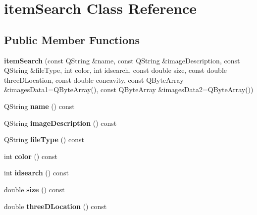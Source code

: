 \hypertarget{classitemSearch}{}\section{item\+Search Class Reference}
\label{classitemSearch}
\subsection*{Public Member Functions}
\begin{DoxyCompactItemize}
\item 
{\bfseries item\+Search} (const Q\+String \&name, const Q\+String \&image\+Description, const Q\+String \&file\+Type, int color, int idsearch, const double size, const double three\+D\+Location, const double concavity, const Q\+Byte\+Array \&images\+Data1=Q\+Byte\+Array(), const Q\+Byte\+Array \&images\+Data2=Q\+Byte\+Array())\hypertarget{classitemSearch_a85c67b414c3c87a1bd7b996bc02aef5d}{}\label{classitemSearch_a85c67b414c3c87a1bd7b996bc02aef5d}

\item 
Q\+String {\bfseries name} () const \hypertarget{classitemSearch_a249682fe8a4947710ad71a1953a7091d}{}\label{classitemSearch_a249682fe8a4947710ad71a1953a7091d}

\item 
Q\+String {\bfseries image\+Description} () const \hypertarget{classitemSearch_adfd20da4a00f458f588fe10efd343fce}{}\label{classitemSearch_adfd20da4a00f458f588fe10efd343fce}

\item 
Q\+String {\bfseries file\+Type} () const \hypertarget{classitemSearch_a39f067ed6a2b31483f757b1ee6ad8c76}{}\label{classitemSearch_a39f067ed6a2b31483f757b1ee6ad8c76}

\item 
int {\bfseries color} () const \hypertarget{classitemSearch_acfb32785b9acaab5c16c89ea4bea8440}{}\label{classitemSearch_acfb32785b9acaab5c16c89ea4bea8440}

\item 
int {\bfseries idsearch} () const \hypertarget{classitemSearch_a347ab3b23d67c55e92a5d5dab6d27f34}{}\label{classitemSearch_a347ab3b23d67c55e92a5d5dab6d27f34}

\item 
double {\bfseries size} () const \hypertarget{classitemSearch_a786dab51fab18005710e164a58750dd9}{}\label{classitemSearch_a786dab51fab18005710e164a58750dd9}

\item 
double {\bfseries three\+D\+Location} () const \hypertarget{classitemSearch_a37429d84b3240e787e491430f61c2f91}{}\label{classitemSearch_a37429d84b3240e787e491430f61c2f91}


\end{DoxyCompactItemize}
